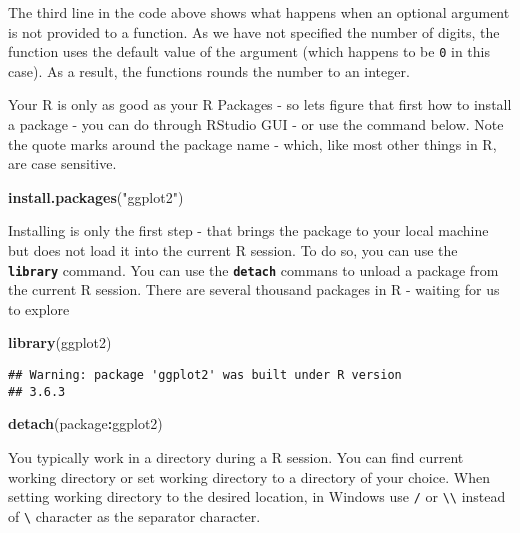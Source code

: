 \documentclass[
]{krantz}
\makeatletter
\newenvironment{Shaded}{\begin{snugshade}}{\end{snugshade}}
\newcommand{\KeywordTok}[1]{\textcolor[rgb]{0.27,0.27,0.27}{\textbf{#1}}}
\newcommand{\NormalTok}[1]{#1}
\newcommand{\OperatorTok}[1]{\textcolor[rgb]{0.43,0.43,0.43}{\textbf{#1}}}
\newcommand{\StringTok}[1]{\textcolor[rgb]{0.5,0.5,0.5}{#1}}
\newenvironment{kframe}{%
\medskip{}
\setlength{\fboxsep}{.8em}
 \def\at@end@of@kframe{}%
 \ifinner\ifhmode%
  \def\at@end@of@kframe{\end{minipage}}%
  \begin{minipage}{\columnwidth}%
 \fi\fi%
 \def\FrameCommand##1{\hskip\@totalleftmargin \hskip-\fboxsep
 \colorbox{shadecolor}{##1}\hskip-\fboxsep
     \hskip-\linewidth \hskip-\@totalleftmargin \hskip\columnwidth}%
 \MakeFramed {\advance\hsize-\width
   \@totalleftmargin\z@ \linewidth\hsize
   \@setminipage}}%
 {\par\unskip\endMakeFramed%
 \at@end@of@kframe}
\renewenvironment{Shaded}{\begin{kframe}}{\end{kframe}}
\makeatother
\begin{document}
The third line in the code above shows what happens when an optional argument is not provided to a function. As we have not specified the number of digits, the function uses the default value of the argument (which happens to be \texttt{0} in this case). As a result, the functions rounds the number to an integer.

Your R is only as good as your R Packages - so lets figure that first how to install a package - you can do through RStudio GUI - or use the command below. Note the quote marks around the package name - which, like most other things in R, are case sensitive.

\begin{Shaded}
\begin{Highlighting}[]
\KeywordTok{install.packages}\NormalTok{(}\StringTok{"ggplot2"}\NormalTok{)}
\end{Highlighting}
\end{Shaded}

Installing is only the first step - that brings the package to your local machine but does not load it into the current R session. To do so, you can use the \textbf{\texttt{library}} command. You can use the \textbf{\texttt{detach}} commans to unload a package from the current R session. There are several thousand packages in R - waiting for us to explore

\begin{Shaded}
\begin{Highlighting}[]
\KeywordTok{library}\NormalTok{(ggplot2)}
\end{Highlighting}
\end{Shaded}

\begin{verbatim}
## Warning: package 'ggplot2' was built under R version
## 3.6.3
\end{verbatim}

\begin{Shaded}
\begin{Highlighting}[]
\KeywordTok{detach}\NormalTok{(package}\OperatorTok{:}\NormalTok{ggplot2)}
\end{Highlighting}
\end{Shaded}

You typically work in a directory during a R session. You can find current working directory or set working directory to a directory of your choice. When setting working directory to the desired location, in Windows use \texttt{/} or \texttt{\textbackslash{}\textbackslash{}} instead of \texttt{\textbackslash{}} character as the separator character.
\end{document}

